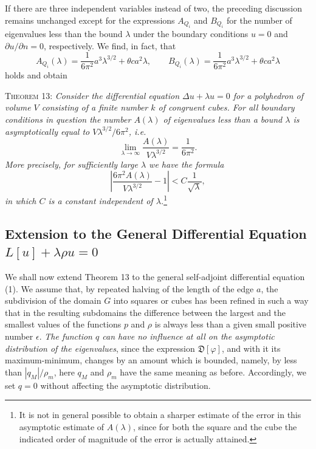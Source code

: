 If there are three independent variables instead of two, the preceding discussion remains unchanged except for the expressions $A_{Q_i}$ and $B_{Q_i}$ for the number of eigenvalues less than the bound $\lambda$ under the boundary conditions $u=0$ and $\partial u/\partial n=0$, respectively. We find, in fact, that
\begin{equation}\tag{26a}
A_{Q_i}(\lambda)=\frac1{6\pi^2}a^3\lambda^{3/2}+\theta ca^2\lambda,
\qquad
B_{Q_i}(\lambda)=\frac1{6\pi^2}a^3\lambda^{3/2}+\theta ca^2\lambda
\end{equation}
holds and obtain

\textsc{Theorem 13:} \emph{Consider the differential equation $\Delta u+\lambda u=0$ for a polyhedron of volume $V$ consisting of a finite number $k$ of congruent cubes. For all boundary conditions in question the number $A(\lambda)$ of eigenvalues less than a bound $\lambda$ is asymptotically equal to $V\lambda^{3/2}/6\pi^2$, i.e.}
\begin{equation}\tag{27a}
\lim_{\lambda\to\infty}\frac{A(\lambda)}{V\lambda^{3/2}}=\frac1{6\pi^2}.
\end{equation}
\emph{More precisely, for sufficiently large $\lambda$ we have the formula}
\begin{equation}\tag{28a}
\left|\frac{6\pi^2A(\lambda)}{V\lambda^{3/2}}-1\right|<C\frac1{\sqrt\lambda},
\end{equation}
\emph{in which $C$ is a constant independent of $\lambda$.}\footnote{It is not in general possible to obtain a sharper estimate of the error in this asymptotic estimate of $A(\lambda)$, since for both the square and the cube the indicated order of magnitude of the error is actually attained.}

\subsection{Extension to the General Differential Equation $L[u]+\lambda\rho u=0$}
We shall now extend Theorem 13 to the general self-adjoint differential equation (1). We assume that, by repeated halving of the length of the edge $a$, the subdivision of the domain $G$ into squares or cubes has been refined in such a way that in the resulting subdomains the difference between the largest and the smallest values of the functions $p$ and $\rho$ is always less than a given small positive number $\epsilon$. \emph{The function $q$ can have no influence at all on the asymptotic distribution of the eigenvalues}, since the expression $\mathfrak D[\varphi]$, and with it its maximum-minimum, changes by an amount which is bounded, namely, by less than $|q_M|/\rho_m$, here $q_M$ and $\rho_m$ have the same meaning as before. Accordingly, we set $q=0$ without affecting the asymptotic distribution.


